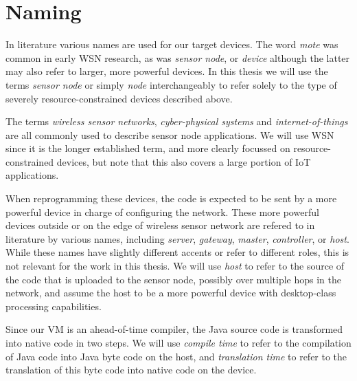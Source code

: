 \section{Naming}
In literature various names are used for our target devices. The word \emph{mote} was common in early WSN research, as was \emph{sensor node}, or \emph{device} although the latter may also refer to larger, more powerful devices. In this thesis we will use the terms \emph{sensor node} or simply \emph{node} interchangeably to refer solely to the type of severely resource-constrained devices described above.

The terms \emph{wireless sensor networks}, \emph{cyber-physical systems} and \emph{internet-of-things} are all commonly used to describe sensor node applications. We will use WSN since it is the longer established term, and more clearly focussed on resource-constrained devices, but note that this also covers a large portion of IoT applications.

When reprogramming these devices, the code is expected to be sent by a more powerful device in charge of configuring the network. These more powerful devices outside or on the edge of wireless sensor network are refered to in literature by various names, including \emph{server}, \emph{gateway}, \emph{master}, \emph{controller}, or \emph{host}. While these names have slightly different accents or refer to different roles, this is not relevant for the work in this thesis. We will use \emph{host} to refer to the source of the code that is uploaded to the sensor node, possibly over multiple hops in the network, and assume the host to be a more powerful device with desktop-class processing capabilities.

Since our VM is an ahead-of-time compiler, the Java source code is transformed into native code in two steps. We will use \emph{compile time} to refer to the compilation of Java code into Java byte code on the host, and \emph{translation time} to refer to the translation of this byte code into native code on the device.
